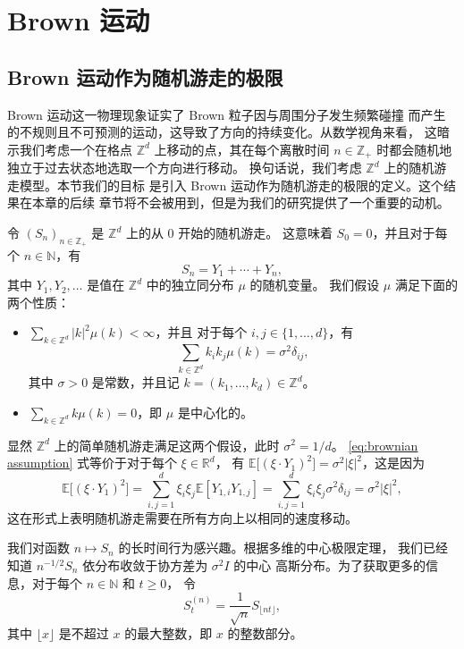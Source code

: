 \chapter{Brown 运动}

\section{Brown 运动作为随机游走的极限}

Brown 运动这一物理现象证实了 Brown 粒子因与周围分子发生频繁碰撞
而产生的不规则且不可预测的运动，这导致了方向的持续变化。从数学视角来看，
这暗示我们考虑一个在格点 $\mathbb{Z}^d$ 上移动的点，其在每个离散时间
$n\in \mathbb{Z}_+$ 时都会随机地独立于过去状态地选取一个方向进行移动。
换句话说，我们考虑 $\mathbb{Z}^d$ 上的随机游走模型。本节我们的目标
是引入 Brown 运动作为随机游走的极限的定义。这个结果在本章的后续
章节将不会被用到，但是为我们的研究提供了一个重要的动机。

令 $(S_n)_{n\in \mathbb{Z}_+}$ 是 $\mathbb{Z}^d$ 上的从 $0$ 开始的随机游走。
这意味着 $S_0=0$，并且对于每个 $n\in \mathbb{N}$，有
\[
  S_n=Y_1+\cdots +Y_n,
\]
其中 $Y_1,Y_2,\dots$ 是值在 $\mathbb{Z}^d$ 中的独立同分布 $\mu$ 的随机变量。
我们假设 $\mu$ 满足下面的两个性质：
\begin{itemize}[noitemsep]
  \item $\sum_{k\in \mathbb{Z}^d}|k|^2\mu(k)<\infty$，并且
  对于每个 $i,j\in \{1,\dots,d\}$，有
  \begin{equation}\label{eq:brownian assumption}
    \sum_{k\in \mathbb{Z}^d}k_ik_j\mu(k)=\sigma^2 \delta_{ij},
  \end{equation}
  其中 $\sigma>0$ 是常数，并且记 $k=(k_1,\dots,k_d)\in \mathbb{Z}^d$。
  \item $\sum_{k\in \mathbb{Z}^d}k\mu (k)=0$，即 $\mu$ 是中心化的。
\end{itemize}

显然 $\mathbb{Z}^d$ 上的简单随机游走满足这两个假设，此时 $\sigma^2=1/d$。
\eqref{eq:brownian assumption} 式等价于对于每个 $\xi\in \mathbb{R}^d$，
有 $\mathbb{E}\bigl[(\xi\cdot Y_1)^2\bigr]=\sigma^2 |\xi|^2$，这是因为
\[
  \mathbb{E}\bigl[(\xi\cdot Y_1)^2\bigr] = \sum_{i,j=1}^d \xi_i \xi_j \mathbb{E}[Y_{1,i} Y_{1,j}] = 
  \sum_{i,j=1}^d \xi_i \xi_j \sigma^2 \delta_{ij} = \sigma^2 |\xi|^2,
\]
这在形式上表明随机游走需要在所有方向上以相同的速度移动。

我们对函数 $n\mapsto S_n$ 的长时间行为感兴趣。根据多维的中心极限定理，
我们已经知道 $n^{-1/2}S_n$ 依分布收敛于协方差为 $\sigma^2 I$ 的中心
高斯分布。为了获取更多的信息，对于每个 $n\in \mathbb{N}$ 和 $t\geq 0$，
令
\[
  S_t^{(n)}=\frac{1}{\sqrt{n}}S_{\lfloor nt\rfloor},
\]
其中 $\lfloor x\rfloor$ 是不超过 $x$ 的最大整数，即 $x$ 的整数部分。

